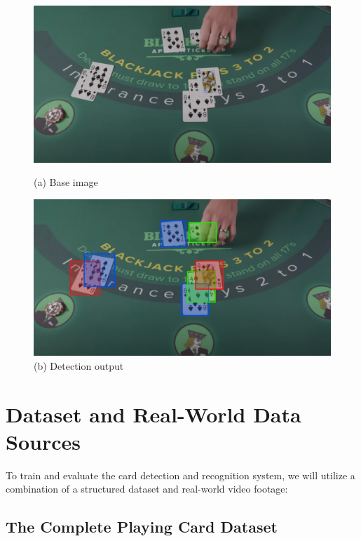 \documentclass{article}
\begin{document}
\begin{figure}[htbp]
    \centering
    \begin{minipage}{0.45\textwidth}
        \centering
        \includegraphics[width=\linewidth]{./assets/example_default.png}
        \caption{(a) Base image}
    \end{minipage}
    \hfill
    \begin{minipage}{0.45\textwidth}
        \centering
        \includegraphics[width=\linewidth]{./assets/example_detected.png}
        \caption{(b) Detection output}
    \end{minipage}
    \label{fig:fig1}
\end{figure}

\section*{Dataset and Real-World Data Sources}

To train and evaluate the card detection and recognition system, we will utilize a combination of a structured dataset and real-world video footage:

\subsection*{The Complete Playing Card Dataset}
\end{document}
